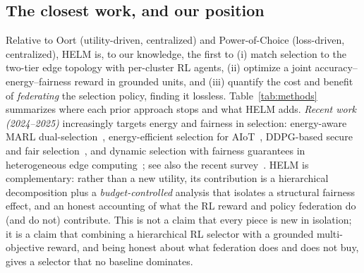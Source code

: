 \documentclass[conference]{IEEEtran}
\begin{document}
\subsection{The closest work, and our position}
Relative to Oort (utility-driven, centralized) and Power-of-Choice (loss-driven,
centralized), HELM is, to our knowledge, the first to (i) match selection to the
two-tier edge topology with per-cluster RL agents, (ii) optimize a joint
accuracy--energy--fairness reward in grounded units, and (iii) quantify the
cost and benefit of \emph{federating} the selection policy, finding it lossless.
Table~\ref{tab:methods} summarizes where each prior approach stops and what HELM
adds. \emph{Recent work (2024--2025)} increasingly targets energy and fairness in selection: energy-aware MARL dual-selection~\cite{marl_energy}, energy-efficient selection for AIoT~\cite{eecsfl}, DDPG-based secure and fair selection~\cite{ddpgfair}, and dynamic selection with fairness guarantees in heterogeneous edge computing~\cite{dynfair}; see also the recent survey~\cite{cssurvey}. HELM is complementary: rather than a new utility, its contribution is a hierarchical decomposition plus a \emph{budget-controlled} analysis that isolates a structural fairness effect, and an honest accounting of what the RL reward and policy federation do (and do not) contribute. This is not a claim that every piece is new in isolation; it is a claim that
combining a hierarchical RL selector with a grounded multi-objective reward, and
being honest about what federation does and does not buy, gives a selector that no
baseline dominates.
\end{document}
